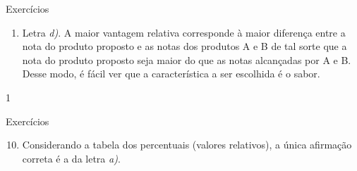 {\begin{answer}{Exercícios}
{\begin{enumerate}
  \item Letra \textit{d)}. A maior vantagem relativa corresponde à maior diferença entre a nota do produto proposto e as notas dos produtos A e B de tal sorte que a nota do produto proposto seja maior do que as notas alcançadas por A e B. Desse modo, é fácil ver que a característica a ser escolhida é o sabor.
  \end{enumerate}
}{1}
\end{answer}
\clearmargin
\begin{answer}{Exercícios}
{\exerciselist
  \begin{enumerate}\setcounter{enumi}{9}
  \item Considerando a tabela dos percentuais (valores relativos), a única afirmação correta é a da letra \textit{a)}. 

\begin{table}[H]
\centering


\end{table}
\end{enumerate}}
\end{answer}}
